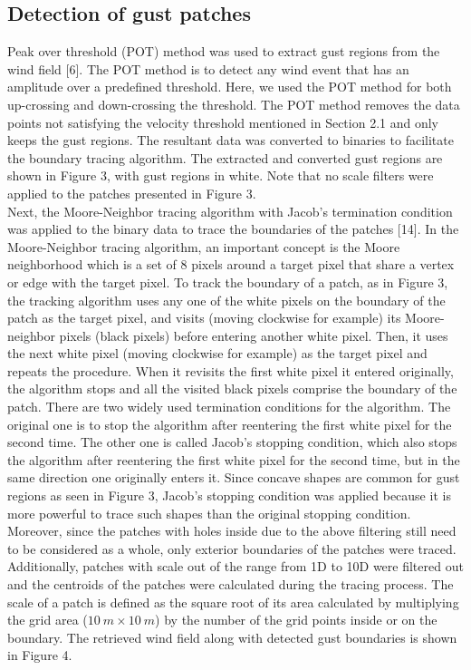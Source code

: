 \subsection{Detection of gust patches}
Peak over threshold (POT) method was used to extract gust regions from the wind field [6]. The POT method is to detect any wind event that has an amplitude over a predefined threshold. Here, we used the POT method for both up-crossing and down-crossing the threshold. The POT method removes the data points not satisfying the velocity threshold mentioned in Section 2.1 and only keeps the gust regions. The resultant data was converted to binaries to facilitate the boundary tracing algorithm. The extracted and converted gust regions are shown in Figure 3, with gust regions in white. Note that no scale filters were applied to the patches presented in Figure 3.\\
Next, the Moore-Neighbor tracing algorithm with Jacob’s termination condition was applied to the binary data to trace the boundaries of the patches [14]. In the Moore-Neighbor tracing algorithm, an important concept is the Moore neighborhood which is a set of 8 pixels around a target pixel that share a vertex or edge with the target pixel. To track the boundary of a patch, as in Figure 3, the tracking algorithm uses any one of the white pixels on the boundary of the patch as the target pixel, and visits (moving clockwise for example) its Moore-neighbor pixels (black pixels) before entering another white pixel. Then, it uses the next white pixel (moving clockwise for example) as the target pixel and repeats the procedure. When it revisits the first white pixel it entered originally, the algorithm stops and all the visited black pixels comprise the boundary of the patch. There are two widely used termination conditions for the algorithm. The original one is to stop the algorithm after reentering the first white pixel for the second time. The other one is called Jacob’s stopping condition, which also stops the algorithm after reentering the first white pixel for the second time, but in the same direction one originally enters it. Since concave shapes are common for gust regions as seen in Figure 3, Jacob’s stopping condition was applied because it is more powerful to trace such shapes than the original stopping condition.\\
Moreover, since the patches with holes inside due to the above filtering still need to be considered as a whole, only exterior boundaries of the patches were traced. Additionally, patches with scale out of the range from 1D to 10D were filtered out and the centroids of the patches were calculated during the tracing process. The scale of a patch is defined as the square root of its area calculated by multiplying the grid area ($10~ m\times10~m$) by the number of the grid points inside or on the boundary. The retrieved wind field along with detected gust boundaries is shown in Figure 4.
